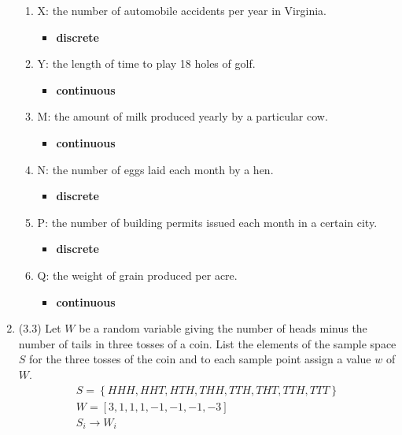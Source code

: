 \documentclass[basic, header]{nosvagor-notes}
\begin{document}
\begin{enumerate}[itemsep=4em]
    \begin{enumerate}[label={}, leftmargin=0em]

      \item X: the number of automobile accidents per year in Virginia.
        \begin{itemize}
          \item \textbf{discrete}

        \end{itemize}
      \item Y: the length of time to play 18 holes of golf.
        \begin{itemize}
          \item \textbf{continuous}

        \end{itemize}
      \item M: the amount of milk produced yearly by a particular cow.
        \begin{itemize}
          \item \textbf{continuous}

        \end{itemize}
      \item N: the number of eggs laid each month by a hen.
        \begin{itemize}
          \item \textbf{discrete}

        \end{itemize}
      \item P: the number of building permits issued each month in a certain city.
        \begin{itemize}
          \item \textbf{discrete}

        \end{itemize}
      \item Q: the weight of grain produced per acre.
        \begin{itemize}
          \item \textbf{continuous}

        \end{itemize}

    \end{enumerate}

  \newpage %

  \item (3.3) Let \(W\) be a random variable giving the number of heads minus the
    number of tails in three tosses of a coin. List the elements of the sample
    space \(S\) for the three tosses of the coin and to each sample point assign a
    value \(w\) of \(W\).
    \begin{align*}
      S = \left\{ HHH, HHT, HTH, THH, TTH, THT, TTH, TTT \right\} \\
      W = \left[ 3, 1, 1, 1, -1, -1, -1, -3 \right] \\
      S_i \to W_i
    \end{align*}


\end{enumerate}
\end{document}
